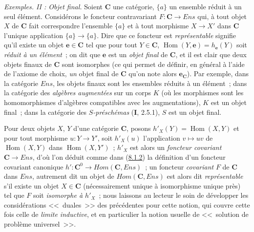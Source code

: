 \begin{env}[8.1.10]
\label{0.8.1.10-fr}
\textit{Exemples. II : Objet final.} Soient $\boldsymbol{C}$ une catégorie, $\{a\}$ un
ensemble réduit à un seul élément. Considérons le foncteur contravariant
$F:\boldsymbol{C}\to\boldsymbol{\mathit{Ens}}$ qui, à tout objet $X$ de $\boldsymbol{C}$ fait correspondre
l'ensemble $\{a\}$ et à tout morphisme $X\to X'$ dans $\boldsymbol{C}$ l'unique
application $\{a\}\to\{a\}$. Dire que ce foncteur est \emph{représentable}
signifie qu'il existe un objet $\boldsymbol{e}\in\boldsymbol{C}$ tel que pour tout $Y\in\boldsymbol{C}$,
$\operatorname{Hom}(Y,\boldsymbol{e})=h_{\mathbf{e}}(Y)$ soit \emph{réduit à un élément}~; on dit
que $\boldsymbol{e}$ est un \emph{objet final} de $\boldsymbol{C}$, et il est clair que deux objets
finaux de $\boldsymbol{C}$ sont isomorphes (ce qui permet de définir, en général à l'aide
de l'axiome de choix, \emph{un} objet final de $\boldsymbol{C}$ qu'on note alors $\boldsymbol{e}_{\mathbf{C}}$). Par
exemple, dans la catégorie $\boldsymbol{\mathit{Ens}}$, les objets finaux sont les
ensembles réduits à un élément~; dans la catégorie des \emph{algèbres
augmentées} sur un corps $K$ (où les morphismes sont les homomorphismes
d'algèbres compatibles avec les augmentations), $K$ est un objet final~;
dans la catégorie des \emph{$S$-préschémas} (\textbf{I}, 2.5.1), $S$ est un objet
final.
\end{env}

\begin{env}[8.1.11]
\label{0.8.1.11-fr}
Pour deux objets $X$, $Y$ d'une catégorie $\boldsymbol{C}$, posons
$h'_X(Y)=\operatorname{Hom}(X,Y)$ et pour tout morphisme $u:Y\to Y'$, soit
$h'_X(u)$ l'application $v\mapsto uv$ de $\operatorname{Hom}(X,Y)$ dans
$\operatorname{Hom}(X,Y')$~; $h'_X$ est alors un \emph{foncteur covariant}
$\boldsymbol{C}\to\boldsymbol{\mathit{Ens}}$, d'où l'on déduit comme dans
(\hyperref[0.8.1.2-fr]{8.1.2}) la définition d'un foncteur covariant
canonique $h':\boldsymbol{C}^0\to\boldsymbol{\mathit{Hom}}(\boldsymbol{C},\boldsymbol{\mathit{Ens}})$~; un foncteur
\emph{covariant} $F$ de $\boldsymbol{C}$ dans $\boldsymbol{\mathit{Ens}}$, autrement dit un objet de
$\boldsymbol{\mathit{Hom}}(\boldsymbol{C},\boldsymbol{\mathit{Ens}})$ est alors dit \emph{représentable}
s'il existe un objet $X\in\boldsymbol{C}$ (nécessairement unique à isomorphisme unique
près) tel que $F$ soit \emph{isomorphe à $h'_X$}~; nous laissons au lecteur
le soin de développer les considérations <<~duales~>> des précédentes pour
cette notion, qui couvre cette fois celle de \emph{limite inductive}, et en
particulier la notion usuelle de <<~solution de problème universel~>>.
\end{env}

